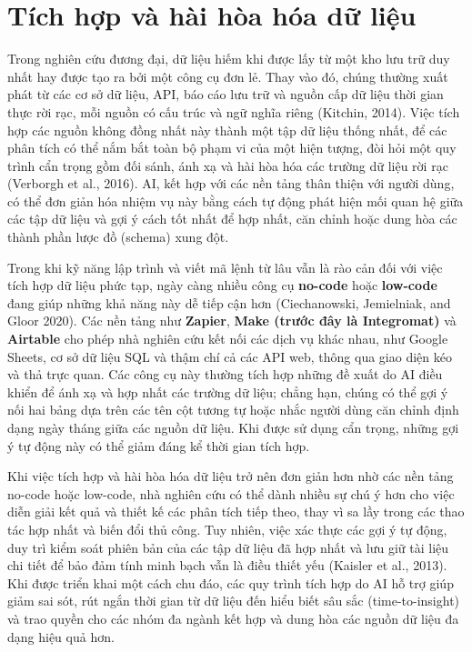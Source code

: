 \section{Tích hợp và hài hòa hóa dữ liệu}

Trong nghiên cứu đương đại, dữ liệu hiếm khi được lấy từ một kho lưu trữ duy nhất hay được tạo ra bởi một công cụ đơn lẻ. Thay vào đó, chúng thường xuất phát từ các cơ sở dữ liệu, API, báo cáo lưu trữ và nguồn cấp dữ liệu thời gian thực rời rạc, mỗi nguồn có cấu trúc và ngữ nghĩa riêng (Kitchin, 2014). Việc tích hợp các nguồn không đồng nhất này thành một tập dữ liệu thống nhất, để các phân tích có thể nắm bắt toàn bộ phạm vi của một hiện tượng, đòi hỏi một quy trình cẩn trọng gồm đối sánh, ánh xạ và hài hòa hóa các trường dữ liệu rời rạc (Verborgh et al., 2016). AI, kết hợp với các nền tảng thân thiện với người dùng, có thể đơn giản hóa nhiệm vụ này bằng cách tự động phát hiện mối quan hệ giữa các tập dữ liệu và gợi ý cách tốt nhất để hợp nhất, căn chỉnh hoặc dung hòa các thành phần lược đồ (schema) xung đột.

Trong khi kỹ năng lập trình và viết mã lệnh từ lâu vẫn là rào cản đối với việc tích hợp dữ liệu phức tạp, ngày càng nhiều công cụ \textbf{no-code} hoặc \textbf{low-code} đang giúp những khả năng này dễ tiếp cận hơn (Ciechanowski, Jemielniak, and Gloor 2020). Các nền tảng như \textbf{Zapier}, \textbf{Make (trước đây là Integromat)} và \textbf{Airtable} cho phép nhà nghiên cứu kết nối các dịch vụ khác nhau, như Google Sheets, cơ sở dữ liệu SQL và thậm chí cả các API web, thông qua giao diện kéo và thả trực quan. Các công cụ này thường tích hợp những đề xuất do AI điều khiển để ánh xạ và hợp nhất các trường dữ liệu; chẳng hạn, chúng có thể gợi ý nối hai bảng dựa trên các tên cột tương tự hoặc nhắc người dùng căn chỉnh định dạng ngày tháng giữa các nguồn dữ liệu. Khi được sử dụng cẩn trọng, những gợi ý tự động này có thể giảm đáng kể thời gian tích hợp.

Khi việc tích hợp và hài hòa hóa dữ liệu trở nên đơn giản hơn nhờ các nền tảng no-code hoặc low-code, nhà nghiên cứu có thể dành nhiều sự chú ý hơn cho việc diễn giải kết quả và thiết kế các phân tích tiếp theo, thay vì sa lầy trong các thao tác hợp nhất và biến đổi thủ công. Tuy nhiên, việc xác thực các gợi ý tự động, duy trì kiểm soát phiên bản của các tập dữ liệu đã hợp nhất và lưu giữ tài liệu chi tiết để bảo đảm tính minh bạch vẫn là điều thiết yếu (Kaisler et al., 2013). Khi được triển khai một cách chu đáo, các quy trình tích hợp do AI hỗ trợ giúp giảm sai sót, rút ngắn thời gian từ dữ liệu đến hiểu biết sâu sắc (time-to-insight) và trao quyền cho các nhóm đa ngành kết hợp và dung hòa các nguồn dữ liệu đa dạng hiệu quả hơn.

